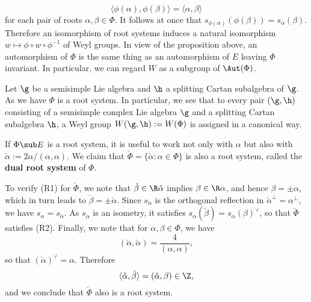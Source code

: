 \[\langle\phi(\alpha),\phi(\beta)\rangle=\langle\alpha,\beta\rangle\]
for each pair of roots $\alpha,\beta\in\Phi$. It follows at once that $s_{\phi(\alpha)}(\phi(\beta))=s_{\alpha}(\beta)$. Therefore an isomorphism of root systems induces a natural isomorphism $w\mapsto\phi\circ w\circ\phi^{-1}$ of Weyl groups. In view of the proposition above, an automorphism of $\Phi$ is the same thing as an automorphism of $E$ leaving $\Phi$ invariant. In particular, we can regard $W$ as a subgroup of $\Aut(\Phi)$.
\begin{example}
Let $\g$ be a semisimple Lie algebra and $\h$ a splitting Cartan subalgebra of $\g$. As we have $\Phi$ is a root system. In particular, we see that to every pair $(\g,\h)$ consisting of a semisimple complex Lie algebra $\g$ and a splitting Cartan subalgebra $\h$, a Weyl group $W(\g,\h):=W(\Phi)$ is assigned in a canonical way.
\end{example}
\begin{example}
If $\Phi\sub E$ is a root system, it is useful to work not only with $\alpha$ but also with $\check{\alpha}:=2\alpha/(\alpha,\alpha)$. We claim that $\check{\Phi}=\{\check{\alpha}:\alpha\in\Phi\}$ is also a root system, called the \textbf{dual root system} of $\Phi$.\par
To verify (R1) for $\check{\Phi}$, we note that $\check{\beta}\in\R\check{\alpha}$ implies $\beta\in\R\alpha$, and hence $\beta=\pm\alpha$, which in turn leads to $\check{\beta}=\pm\check{\alpha}$. Since $s_{\check{\alpha}}$ is the orthogonal reflection in $\check{\alpha}^\bot=\alpha^\bot$, we have $s_\alpha=s_{\check{\alpha}}$. As $s_\alpha$ is an isometry, it satisfies $s_\alpha(\check{\beta})=s_\alpha(\beta)^\vee$, so that $\check{\Phi}$ satisfies (R2). Finally, we note that for $\alpha,\beta\in\Phi$, we have
\[(\check{\alpha},\check{\alpha})=\frac{4}{(\alpha,\alpha)},\]
so that $(\check{\alpha})^\vee=\alpha$. Therefore
\[\langle\check{\alpha},\check{\beta}\rangle=(\check{\alpha},\beta)\in\Z,\]
and we conclude that $\check{\Phi}$ also is a root system.
\end{example}
